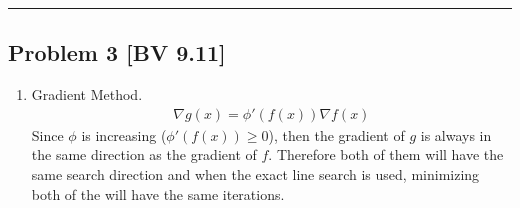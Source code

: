 \documentclass[12pt, letterpaper, twoside]{article}
\begin{document}
\hrule


\subsection*{Problem 3 \small[BV 9.11]}
\begin{enumerate}
    \item Gradient Method.
    \begin{align*}
        \nabla g(x) = \phi'(f(x)) \nabla f(x)
    \end{align*}
    Since $\phi$ is increasing ($\phi'(f(x))\geq0$), then the gradient of $g$ is always in the same direction as the gradient of $f$. Therefore both of them will have the same search direction and when the exact line search is used, minimizing both of the will have the same iterations.
    

\end{enumerate}
\end{document}
